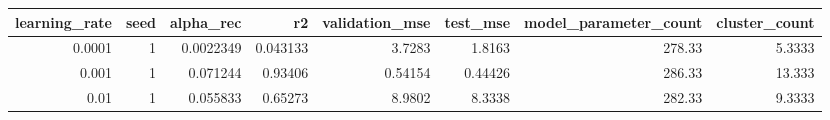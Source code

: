 \begin{tabular}{rrrrrrrr}
\toprule
learning\_rate & seed & alpha\_rec & r2 & validation\_mse & test\_mse & model\_parameter\_count & cluster\_count \\
\midrule
0.0001 & 1 & 0.0022349 & 0.043133 & 3.7283 & 1.8163 & 278.33 & 5.3333 \\
0.001 & 1 & 0.071244 & 0.93406 & 0.54154 & 0.44426 & 286.33 & 13.333 \\
0.01 & 1 & 0.055833 & 0.65273 & 8.9802 & 8.3338 & 282.33 & 9.3333 \\
\bottomrule
\end{tabular}
